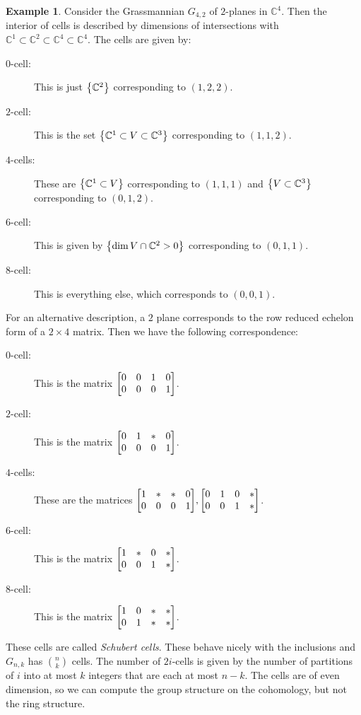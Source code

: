 \documentclass[leqno, openany]{memoir}
\theoremstyle{definition}
\newtheorem{exm}[thm]{Example}
\theoremstyle{remark}
\theoremstyle{plain}
\theoremstyle{definition}
\theoremstyle{remark}
\newcommand{\C}{\mathbb{C}}
\begin{document}
\begin{exm} Consider the Grassmannian $G_{4,2}$ of $2$-planes in $\C^4$. Then
    the interior of cells is described by dimensions of intersections with
    $\C^1 \subset \C^2 \subset \C^4 \subset \C^4$. The cells are given by:
    \begin{description} \item[$0$-cell:] This is just $\qty{\C^2}$
        corresponding to $(1,2,2)$.  \item[$2$-cell:] This is the set
        $\qty{\C^1 \subset V \subset \C^3}$ corresponding to $(1,1,2)$.
    \item[$4$-cells:] These are $\qty{\C^1 \subset V}$ corresponding to
        $(1,1,1)$ and $\qty{V \subset \C^3}$ corresponding to $(0,1,2)$.
    \item[$6$-cell:] This is given by $\qty{\dim V \cap \C^2 > 0}$
        corresponding to $(0,1,1)$.  \item[$8$-cell:] This is everything else,
        which corresponds to $(0,0,1)$.  \end{description} \end{exm}

For an alternative description, a $2$ plane corresponds to the row reduced
echelon form of a $2 \times 4$ matrix. Then we have the following
correspondence: \begin{description} \item[$0$-cell:] This is the matrix $\mqty[
    0 & 0 & 1 & 0 \\ 0 & 0 & 0 & 1 ]$.  \item[$2$-cell:] This is the matrix
    $\mqty[ 0 & 1 & * & 0 \\ 0 & 0 & 0 & 1 ]$.  \item[$4$-cells:] These are the
    matrices $\mqty[ 1 & * & * & 0 \\ 0 & 0 & 0 & 1 ], \mqty[ 0 & 1 & 0 & * \\
    0 & 0 & 1 & * ]$.  \item[$6$-cell:] This is the matrix $\mqty[ 1 & * & 0 &
    * \\ 0 & 0 & 1 & * ]$.  \item[$8$-cell:] This is the matrix $\mqty[ 1 & 0 &
    * & * \\ 0 & 1 & * & * ]$.  \end{description} These cells are called
    \textit{Schubert cells}. These behave nicely with the inclusions and
    $G_{n,k}$ has $\binom{n}{k}$ cells. The number of $2i$-cells is given by
    the number of partitions of $i$ into at most $k$ integers that are each at
    most $n-k$. The cells are of even dimension, so we can compute the group
    structure on the cohomology, but not the ring structure.
\end{document}
